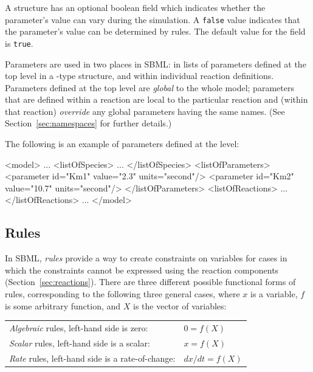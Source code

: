 \documentclass[10pt]{cekarticle}
\begin{document}
A  structure has an optional 
boolean field which indicates whether the parameter's value can
vary during the simulation.  A \texttt{false} value indicates that
the parameter's value can be determined by rules.  The
default value for the  field is \texttt{true}.

Parameters are used in two places in SBML: in lists of parameters defined
at the top level in a -type structure, and within individual
reaction definitions.  Parameters defined at the top level are
\emph{global} to the whole model; parameters that are defined within
a reaction are local to the particular reaction and (within that reaction)
\emph{override} any global parameters having the same names.  (See
Section~\ref{sec:namespaces} for further details.)

The following is an example of parameters defined at the  level:

\begin{example}
<model>
    ...
    <listOfSpecies>
        ...
    </listOfSpecies>
    <listOfParameters>
        <parameter id="Km1" value="2.3" units="second"/>
        <parameter id="Km2" value="10.7" units="second"/>
    </listOfParameters>
    <listOfReactions>
        ...
    </listOfReactions>
    ...
</model>
\end{example}

\subsection{Rules}
\label{sec:rules}

In SBML, \emph{rules} provide a way to create constraints on
variables for cases in which the constraints cannot be expressed
using the reaction components (Section~\ref{sec:reactions}). There
are three different possible functional forms of rules,
corresponding to the following three general cases, where $x$ is a
variable, $f$ is some arbitrary function, and $X$ is the vector of
variables:

\begin{center}
\begin{tabular}{ll}
  \emph{Algebraic} rules, left-hand side is zero:             & $0 = f(X)$\\
  \emph{Scalar} rules, left-hand side is a scalar:         & $x = f(X)$\\
  \emph{Rate} rules, left-hand side is a rate-of-change: & $dx/dt = f(X)$
\end{tabular}
\end{center}
\end{document}
